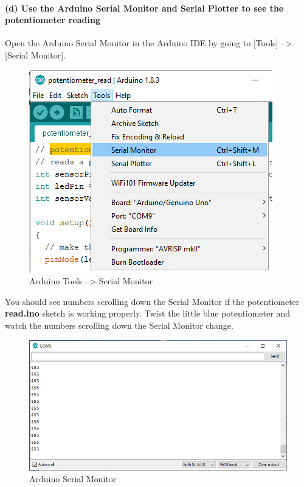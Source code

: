 \documentclass[11pt]{article}
\makeatletter
\def\maxwidth{\ifdim\Gin@nat@width>\linewidth\linewidth
    \else\Gin@nat@width\fi}
\let\Oldincludegraphics\includegraphics
\renewcommand{\includegraphics}[1]{\Oldincludegraphics[width=.8\maxwidth]{#1}}
\makeatother
\begin{document}
    \hypertarget{d-use-the-arduino-serial-monitor-and-serial-plotter-to-see-the-potentiometer-reading}{%
\paragraph{(d) Use the Arduino Serial Monitor and Serial Plotter to see
the potentiometer
reading}\label{d-use-the-arduino-serial-monitor-and-serial-plotter-to-see-the-potentiometer-reading}}

Open the Arduino Serial Monitor in the Arduino IDE by going to
{[}Tools{]} --\textgreater{} {[}Serial Monitor{]}.

\begin{figure}
\centering
\includegraphics{images/Tools_SerialMonitor.png}
\caption{Arduino Tools --\textgreater{} Serial Monitor}
\end{figure}

You should see numbers scrolling down the Serial Monitor if the
potentiometer \textbf{read.ino} sketch is working properly. Twist the
little blue potentiometer and watch the numbers scrolling down the
Serial Monitor change.

\begin{figure}
\centering
\includegraphics{images/serial_monitor_output.png}
\caption{Arduino Serial Monitor}
\end{figure}
\end{document}
